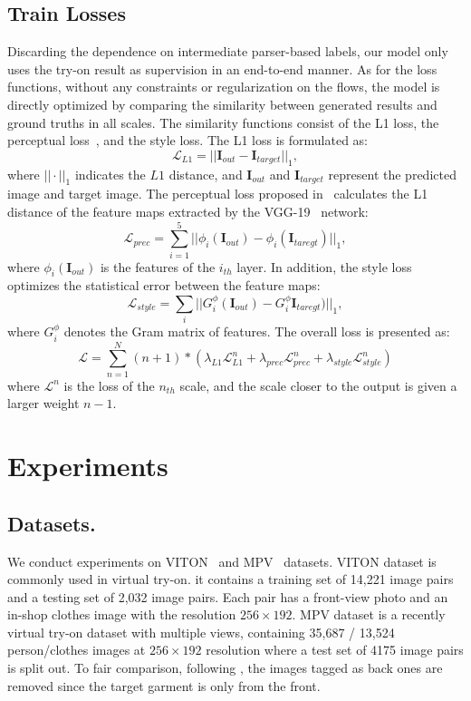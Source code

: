 \documentclass[runningheads]{llncs}
\begin{document}
\subsection{Train Losses}
Discarding the dependence on intermediate parser-based labels, our model only uses the try-on result as supervision in an end-to-end manner. As for the loss functions, without any constraints or regularization on the flows, the model is directly optimized by comparing the similarity between generated results and ground truths in all scales. The similarity functions consist of the L1 loss, the perceptual loss~\cite{johnson2016perceptual}, and the style loss.
The L1 loss is formulated as:
\begin{equation}
\mathcal{L}_{L1} = ||\bm{I}_{out} - \bm{I}_{target} ||_1,
\end{equation}
where $||\cdot||_1$ indicates the $L1$ distance, and $\bm{I}_{out}$ and $\bm{I}_{target}$ represent the predicted image and target image. The perceptual loss proposed in~\cite{johnson2016perceptual} calculates the L1 distance of the feature maps extracted by the VGG-19~\cite{vgg} network:
\begin{equation}
\mathcal{L}_{prec} = \sum_{i=1}^5 ||\phi_i (\bm{I}_{out}) - \phi_i(\bm{I}_{taregt}) ||_1,
\end{equation} 
where $\phi_i(\bm{I}_{out})$ is the features of the $i_{th}$ layer. In addition, the style loss optimizes the statistical error between the feature maps:
\begin{equation}
\mathcal{L}_{style} = \sum_i ||G_i^\phi (\bm{I}_{out}) - G_i^\phi\bm{I}_{taregt}) ||_1,
\end{equation}
where $G_i^\phi$ denotes the Gram matrix of features. The overall loss is presented as:
\begin{equation}
\mathcal{L} = \sum_{n=1}^N(n+1)*(\lambda_{L1} \mathcal{L}_{L1}^n + \lambda_{prec} \mathcal{L}_{prec}^n + \lambda_{style} \mathcal{L}_{style}^n)
\end{equation}
where $\mathcal{L}^n$ is the loss of the $n_{th}$ scale, and the scale closer to the output is given a larger weight $n-1$.



\section{Experiments}


 \subsection{Datasets.} 
 We conduct experiments on VITON~\cite{han2018viton} and MPV~\cite{MPV} datasets. VITON dataset is commonly used in virtual try-on. it contains a training set of 14,221 image pairs and a testing set of 2,032 image pairs. Each pair has a front-view photo and an in-shop clothes image with the resolution $256 \times 192$. MPV dataset is a recently virtual try-on dataset with multiple views, containing 35,687 / 13,524 person/clothes images at $256 \times 192$ resolution where a test set of 4175 image pairs is split out. To fair comparison, following \cite{issenhuth2020not,ge2021parser}, the images tagged as back ones are removed since the target garment is only from the front. 
\end{document}
